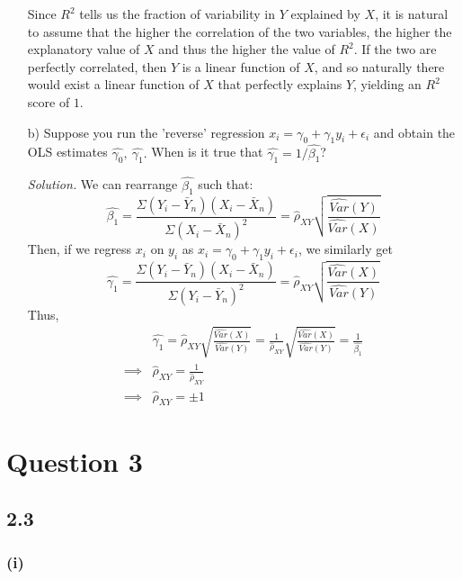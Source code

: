 \documentclass[
]{article}
\begin{document}
\begin{enumerate}
Since $R^2$ tells us the fraction of variability in $Y$ explained by $X$, it is natural to assume that the higher the correlation of the two variables, the higher the explanatory value of $X$ and thus the higher the value of $R^2$. If the two are perfectly correlated, then $Y$ is a linear function of $X$, and so naturally there would exist a linear function of $X$ that perfectly explains $Y$, yielding an $R^2$ score of $1$.  

\item[b)] Suppose you run the ’reverse’ regression $x_i = \gamma_0 + \gamma_1y_i + \epsilon_i$ and obtain the OLS estimates $\hat{\gamma_0}, \: \hat{\gamma_1}.$ When is it true that $\hat{\gamma_1} = 1/\hat{\beta_1}$?  
  
\textit{Solution.}  
We can rearrange $\hat{\beta_1}$ such that: 
\[\hat{\beta_1} = \frac{\Sigma(Y_i - \bar{Y}_n)(X_i - \bar{X}_n)}{\Sigma (X_i - \bar{X}_n)^2} = \hat{\rho}_{XY}\sqrt{\frac{\hat{Var}(Y)}{\hat{Var}(X)}}\]
Then, if we regress $x_i$ on $y_i$ as $x_i = \gamma_0 + \gamma_1y_i + \epsilon_i$, we similarly get 
\[\hat{\gamma_1} = \frac{\Sigma(Y_i - \bar{Y}_n)(X_i - \bar{X}_n)}{\Sigma (Y_i - \bar{Y}_n)^2} = \hat{\rho}_{XY}\sqrt{\frac{\hat{Var}(X)}{\hat{Var}(Y)}}\]
Thus, 
\[\begin{aligned} 
&\hat{\gamma_1} = \hat{\rho}_{XY}\sqrt{\frac{\hat{Var}(X)}{\hat{Var}(Y)}} = \frac{1}{\hat{\rho}_{XY}}\sqrt{\frac{\hat{Var}(X)}{\hat{Var}(Y)}} = \frac{1}{\hat{\beta_1}} \\
\implies& \hat{\rho}_{XY} = \frac{1}{\hat{\rho}_{XY}} \\
\implies& \hat{\rho}_{XY} = \pm 1
\end{aligned}\]

\end{enumerate}

\hypertarget{question-3}{%
\section{Question 3}\label{question-3}}

\hypertarget{section-2}{%
\subsection{2.3}\label{section-2}}

\hypertarget{i-2}{%
\subsubsection{(i)}\label{i-2}}
\end{document}
